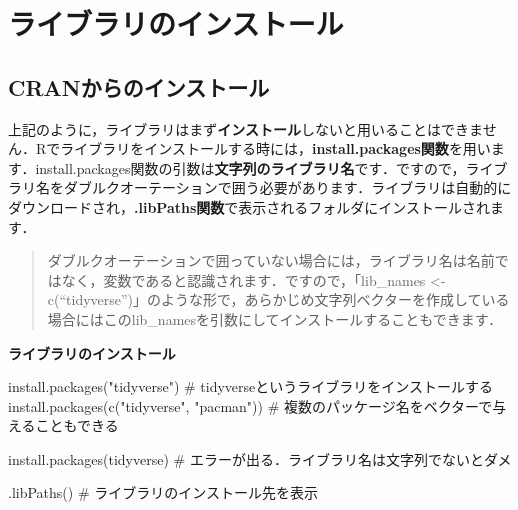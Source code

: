 \documentclass[
  letterpaper,
  DIV=11,
  numbers=noendperiod]{scrreprt}
\newenvironment{Shaded}{\begin{snugshade}}{\end{snugshade}}
\newcommand{\CommentTok}[1]{\textcolor[rgb]{0.37,0.37,0.37}{#1}}
\newcommand{\FunctionTok}[1]{\textcolor[rgb]{0.28,0.35,0.67}{#1}}
\newcommand{\NormalTok}[1]{\textcolor[rgb]{0.00,0.23,0.31}{#1}}
\newcommand{\StringTok}[1]{\textcolor[rgb]{0.13,0.47,0.30}{#1}}
\begin{document}
\hypertarget{ux30e9ux30a4ux30d6ux30e9ux30eaux306eux30a4ux30f3ux30b9ux30c8ux30fcux30eb}{%
\section{ライブラリのインストール}\label{ux30e9ux30a4ux30d6ux30e9ux30eaux306eux30a4ux30f3ux30b9ux30c8ux30fcux30eb}}

\hypertarget{cranux304bux3089ux306eux30a4ux30f3ux30b9ux30c8ux30fcux30eb}{%
\subsection{CRANからのインストール}\label{cranux304bux3089ux306eux30a4ux30f3ux30b9ux30c8ux30fcux30eb}}

上記のように，ライブラリはまず\textbf{インストール}しないと用いることはできません．Rでライブラリをインストールする時には，\textbf{install.packages関数}を用います．install.packages関数の引数は\textbf{文字列のライブラリ名}です．ですので，ライブラリ名をダブルクオーテーションで囲う必要があります．ライブラリは自動的にダウンロードされ，\textbf{.libPaths関数}で表示されるフォルダにインストールされます．

\begin{quote}
ダブルクオーテーションで囲っていない場合には，ライブラリ名は名前ではなく，変数であると認識されます．ですので，「lib\_names
\textless-
c(``tidyverse'')」のような形で，あらかじめ文字列ベクターを作成している場合にはこのlib\_namesを引数にしてインストールすることもできます．
\end{quote}

\textbf{ライブラリのインストール}

\begin{Shaded}
\begin{Highlighting}[]
\FunctionTok{install.packages}\NormalTok{(}\StringTok{"tidyverse"}\NormalTok{) }\CommentTok{\# tidyverseというライブラリをインストールする}
\FunctionTok{install.packages}\NormalTok{(}\FunctionTok{c}\NormalTok{(}\StringTok{"tidyverse"}\NormalTok{, }\StringTok{"pacman"}\NormalTok{)) }\CommentTok{\# 複数のパッケージ名をベクターで与えることもできる}

\FunctionTok{install.packages}\NormalTok{(tidyverse) }\CommentTok{\# エラーが出る．ライブラリ名は文字列でないとダメ}

\FunctionTok{.libPaths}\NormalTok{() }\CommentTok{\# ライブラリのインストール先を表示}
\end{Highlighting}
\end{Shaded}
\end{document}
